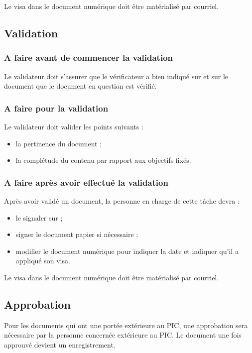 Le visa dans le document numérique doit être matérialisé par courriel. 

\subsection{Validation}
\label{Validation}

\subsubsection*{A faire avant de commencer la validation}
Le validateur doit s'assurer que le vérificateur a bien indiqué sur \lintranet{} et sur le document que le document en question est vérifié.

\subsubsection*{A faire pour la validation}
Le validateur doit valider les points suivants :
\begin{itemize}
\item la pertinence du document ;
\item la complétude du contenu par rapport aux objectifs fixés.
\end{itemize}

\subsubsection*{A faire après avoir effectué la validation}
Après avoir validé un document, la personne en charge de cette tâche devra :
\begin{itemize}
\item le signaler sur \lintranet ;
\item signer le document papier si nécessaire ;
\item modifier le document numérique pour indiquer la date et indiquer qu'il a appliqué son
visa.
\end{itemize}

Le visa dans le document numérique doit être matérialisé par courriel. 


\subsection{Approbation}
\label{Approbation}

Pour les documents qui ont une portée extérieure au PIC, une approbation sera nécessaire par la personne concernée extérieure au PIC. Le document une fois approuvé devient un enregistrement.

